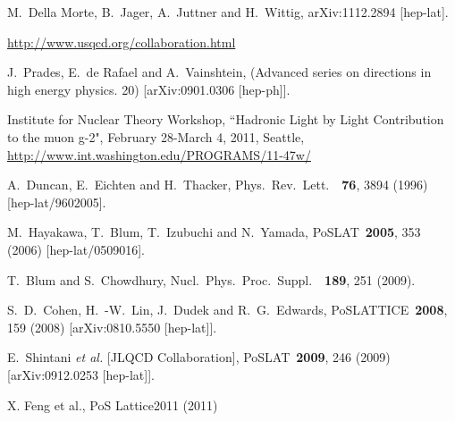 \begin{thebibliography}{99}
  M.~Della Morte, B.~Jager, A.~Juttner and H.~Wittig,
  arXiv:1112.2894 [hep-lat].
  
\url{http://www.usqcd.org/collaboration.html}

  J.~Prades, E.~de Rafael and A.~Vainshtein,
  (Advanced series on directions in high energy physics. 20)
  [arXiv:0901.0306 [hep-ph]].

Institute for Nuclear Theory Workshop, ``Hadronic Light by Light Contribution to the muon g-2", February 28-March 4, 2011, Seattle, \url{http://www.int.washington.edu/PROGRAMS/11-47w/}

  A.~Duncan, E.~Eichten and H.~Thacker,
  Phys.\ Rev.\ Lett.\ \ {\bf 76}, 3894  (1996)
  [hep-lat/9602005].

  M.~Hayakawa, T.~Blum, T.~Izubuchi and N.~Yamada,
  PoSLAT\ {\bf 2005}, 353  (2006)
  [hep-lat/0509016].

  T.~Blum and S.~Chowdhury,
  Nucl.\ Phys.\ Proc.\ Suppl.\ \ {\bf 189}, 251  (2009).

  S.~D.~Cohen, H.~-W.~Lin, J.~Dudek and R.~G.~Edwards,
  PoSLATTICE\ {\bf 2008}, 159  (2008)
  [arXiv:0810.5550 [hep-lat]].


  E.~Shintani {\it et al.} [JLQCD Collaboration],
  PoSLAT\ {\bf 2009}, 246  (2009)
  [arXiv:0912.0253 [hep-lat]].

X. Feng et al., PoS Lattice2011 (2011)



\end{thebibliography}
